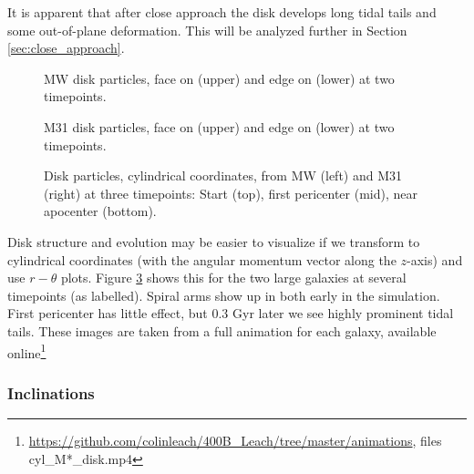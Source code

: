 \documentclass[twocolumn]{aastex63}
\begin{document}
It is apparent that after close approach the disk develops long tidal tails and some out-of-plane deformation. This will be analyzed further in Section \ref{sec:close_approach}.

\begin{figure}[ht!]
	\vspace{-7mm}
	\caption{MW disk particles, face on (upper) and edge on (lower) at two timepoints.
		\label{fig:MW_density_early}}
\end{figure}

\begin{figure}[ht!]
	\vspace{-7mm}
	\caption{M31 disk particles, face on (upper) and edge on (lower) at two timepoints.
		\label{fig:M31_density_early}}
\end{figure}


\begin{figure}[!bht]
	\vspace{-7mm}
	\vspace{-7mm}
	\vspace{-7mm}
	\caption{Disk particles, cylindrical coordinates, from MW (left) and M31 (right) at three timepoints: Start (top), first pericenter (mid), near apocenter (bottom).
		\label{fig:6cyl}}
\end{figure}

Disk structure and evolution may be easier to visualize if we transform to cylindrical coordinates (with the angular momentum vector along the $z$-axis) and use $r-\theta$ plots. Figure \ref{fig:6cyl} shows this for the two large galaxies at several timepoints (as labelled).  Spiral arms show up in both early in the simulation. First pericenter has little effect, but 0.3 Gyr later we see highly prominent tidal tails. These images are taken from a full animation for each galaxy, available online\footnote{\url{https://github.com/colinleach/400B_Leach/tree/master/animations}, files cyl\_M*\_disk.mp4 }

\subsubsection{Inclinations}
\end{document}

